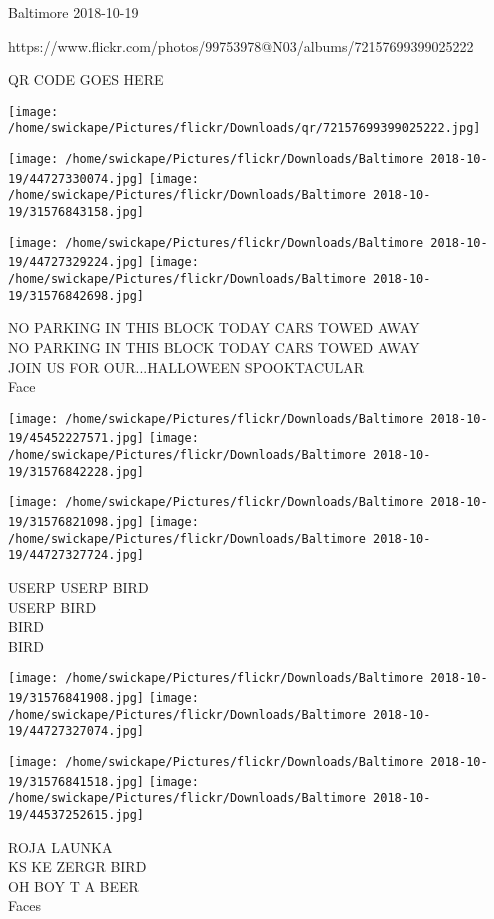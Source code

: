 \documentclass[10pt,letterpaper]{article}
\begin{document}
Baltimore 2018-10-19

https://www.flickr.com/photos/99753978@N03/albums/72157699399025222

QR CODE GOES HERE

\texttt{[image: /home/swickape/Pictures/flickr/Downloads/qr/72157699399025222.jpg]}
\pagebreak

\texttt{[image: /home/swickape/Pictures/flickr/Downloads/Baltimore 2018-10-19/44727330074.jpg]}
\texttt{[image: /home/swickape/Pictures/flickr/Downloads/Baltimore 2018-10-19/31576843158.jpg]}

\texttt{[image: /home/swickape/Pictures/flickr/Downloads/Baltimore 2018-10-19/44727329224.jpg]}
\texttt{[image: /home/swickape/Pictures/flickr/Downloads/Baltimore 2018-10-19/31576842698.jpg]}

NO PARKING IN THIS BLOCK TODAY CARS TOWED AWAY\\
NO PARKING IN THIS BLOCK TODAY CARS TOWED AWAY\\
JOIN US FOR OUR...HALLOWEEN SPOOKTACULAR\\
Face\\
\pagebreak

\texttt{[image: /home/swickape/Pictures/flickr/Downloads/Baltimore 2018-10-19/45452227571.jpg]}
\texttt{[image: /home/swickape/Pictures/flickr/Downloads/Baltimore 2018-10-19/31576842228.jpg]}

\texttt{[image: /home/swickape/Pictures/flickr/Downloads/Baltimore 2018-10-19/31576821098.jpg]}
\texttt{[image: /home/swickape/Pictures/flickr/Downloads/Baltimore 2018-10-19/44727327724.jpg]}

USERP USERP BIRD\\
USERP BIRD\\
BIRD\\
BIRD\\
\pagebreak

\texttt{[image: /home/swickape/Pictures/flickr/Downloads/Baltimore 2018-10-19/31576841908.jpg]}
\texttt{[image: /home/swickape/Pictures/flickr/Downloads/Baltimore 2018-10-19/44727327074.jpg]}

\texttt{[image: /home/swickape/Pictures/flickr/Downloads/Baltimore 2018-10-19/31576841518.jpg]}
\texttt{[image: /home/swickape/Pictures/flickr/Downloads/Baltimore 2018-10-19/44537252615.jpg]}

ROJA LAUNKA\\
KS KE ZERGR BIRD\\
OH BOY T A BEER\\
Faces\\
\pagebreak
\end{document}
